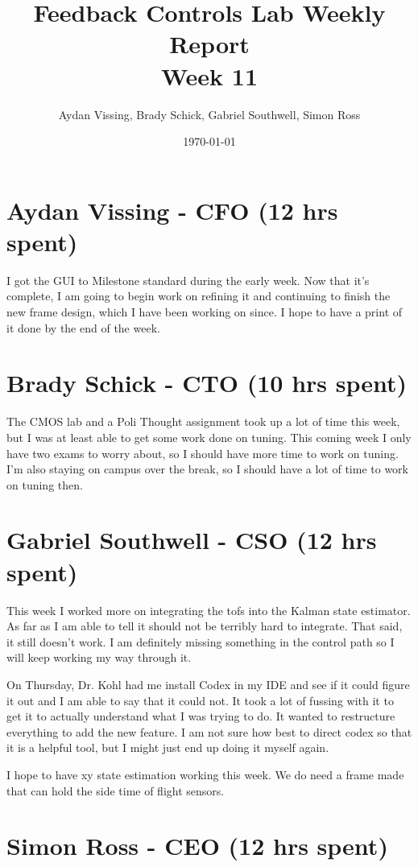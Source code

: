 \documentclass[12pt, titlepage]{article}
\title{Feedback Controls Lab Weekly Report \\ \normalsize{Week 11}}
\author{Aydan Vissing, Brady Schick, Gabriel Southwell, Simon Ross}
\date{\today}
\begin{document}
\maketitle

\section*{Aydan Vissing - CFO (12 hrs spent)}

I got the GUI to Milestone standard during the early week. Now that it's complete, I am going to begin work on refining it and continuing to finish the new frame design, which I have been working on since. I hope to have a print of it done by the end of the week. 

\section*{Brady Schick - CTO (10 hrs spent)}

The CMOS lab and a Poli Thought assignment took up a lot of time this week, but I was at least able to get some work done on tuning. This coming week I only have two exams to worry about, so I should have more time to work on tuning. I'm also staying on campus over the break, so I should have a lot of time to work on tuning then.

\section*{Gabriel Southwell - CSO (12 hrs spent)}

This week I worked more on integrating the tofs into the Kalman state estimator. As far as I am able to tell it should not be terribly hard to integrate. That said, it still doesn't work. I am definitely missing something in the control path so I will keep working my way through it.

On Thursday, Dr. Kohl had me install Codex in my IDE and see if it could figure it out and I am able to say that it could not. It took a lot of fussing with it to get it to actually understand what I was trying to do. It wanted to restructure everything to add the new feature. I am not sure how best to direct codex so that it is a helpful tool, but I might just end up doing it myself again. 

I hope to have xy state estimation working this week. We do need a frame made that can hold the side time of flight sensors. 

\section*{Simon Ross - CEO (12 hrs spent)}
\end{document}
